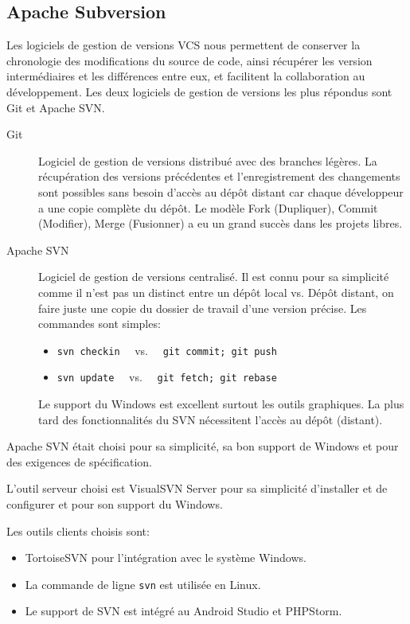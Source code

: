 \subsection{Apache Subversion}

Les logiciels de gestion de versions \acrshort{VCS} nous permettent de
conserver la chronologie des modifications du source de code, ainsi récupérer
les version intermédiaires et les différences entre eux, et facilitent la
collaboration au développement. Les deux logiciels de gestion de versions les
plus répondus sont Git et Apache SVN\@.

\begin{description}
    \item [Git] Logiciel de gestion de versions distribué avec des branches
        légères. La récupération des versions précédentes et l'enregistrement
        des changements sont possibles sans besoin d'accès au dépôt distant car
        chaque développeur a une copie complète du dépôt. Le modèle Fork
        (Dupliquer), Commit (Modifier), Merge (Fusionner) a eu un grand succès
        dans les projets libres.
    \item [Apache SVN] Logiciel de gestion de versions centralisé. Il est connu
        pour sa simplicité comme il n'est pas un distinct entre un dépôt local
        vs. Dépôt distant, on faire juste une copie du dossier de travail d'une
        version précise. Les commandes sont simples:
        \begin{itemize}
            \item \verb|svn checkin| \ \ vs. \ \ \verb|git commit; git push|
            \item \verb|svn update| \ \ vs. \ \ \verb|git fetch; git rebase|
        \end{itemize}
        Le support du Windows est excellent surtout les outils graphiques. La
        plus tard des fonctionnalités du SVN nécessitent l'accès au dépôt
        (distant).
\end{description}

Apache SVN était choisi pour sa simplicité, sa bon support de Windows et pour
des exigences de spécification. 

L'outil serveur choisi est VisualSVN Server pour sa simplicité d'installer et
de configurer et pour son support du Windows.

Les outils clients choisis sont:

\begin{itemize}
    \item TortoiseSVN pour l'intégration avec le système Windows.
    \item La commande de ligne \verb|svn| est utilisée en Linux.
    \item Le support de SVN est intégré au Android Studio et PHPStorm.
\end{itemize}

